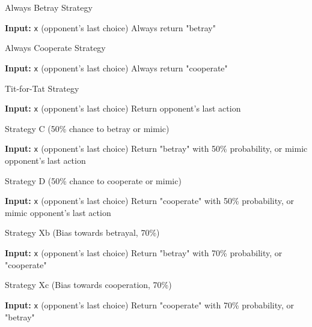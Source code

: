 \documentclass{article}
\begin{document}
\begin{algorithm}[H]
\caption{Always Betray Strategy}
\begin{algorithmic}[1]
\STATE \textbf{Input:} \texttt{x} (opponent's last choice)
\STATE Always return "betray"
\end{algorithmic}
\end{algorithm}

\begin{algorithm}[H]
\caption{Always Cooperate Strategy}
\begin{algorithmic}[1]
\STATE \textbf{Input:} \texttt{x} (opponent's last choice)
\STATE Always return "cooperate"
\end{algorithmic}
\end{algorithm}

\begin{algorithm}[H]
\caption{Tit-for-Tat Strategy}
\begin{algorithmic}[1]
\STATE \textbf{Input:} \texttt{x} (opponent's last choice)
\STATE Return opponent's last action
\end{algorithmic}
\end{algorithm}

\begin{algorithm}[H]
\caption{Strategy C (50\% chance to betray or mimic)}
\begin{algorithmic}[1]
\STATE \textbf{Input:} \texttt{x} (opponent's last choice)
\STATE Return "betray" with 50\% probability, or mimic opponent's last action
\end{algorithmic}
\end{algorithm}

\begin{algorithm}[H]
\caption{Strategy D (50\% chance to cooperate or mimic)}
\begin{algorithmic}[1]
\STATE \textbf{Input:} \texttt{x} (opponent's last choice)
\STATE Return "cooperate" with 50\% probability, or mimic opponent's last action
\end{algorithmic}
\end{algorithm}

\begin{algorithm}[H]
\caption{Strategy Xb (Bias towards betrayal, 70\%)}
\begin{algorithmic}[1]
\STATE \textbf{Input:} \texttt{x} (opponent's last choice)
\STATE Return "betray" with 70\% probability, or "cooperate"
\end{algorithmic}
\end{algorithm}

\begin{algorithm}[H]
\caption{Strategy Xc (Bias towards cooperation, 70\%)}
\begin{algorithmic}[1]
\STATE \textbf{Input:} \texttt{x} (opponent's last choice)
\STATE Return "cooperate" with 70\% probability, or "betray"
\end{algorithmic}
\end{algorithm}
\end{document}
